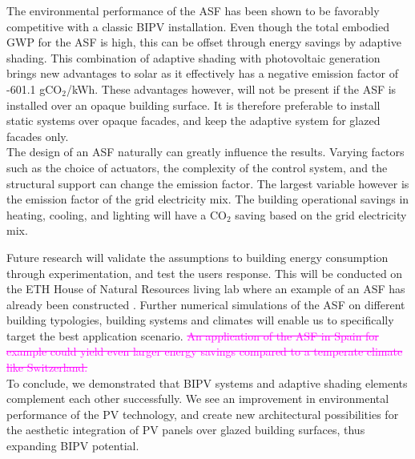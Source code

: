 
The environmental performance of the ASF has been shown to be favorably competitive with a classic BIPV installation. Even though the total embodied GWP for the ASF is high, this can be offset through energy savings by adaptive shading. This combination of adaptive shading with photovoltaic generation brings new advantages to solar as it effectively has a negative emission factor of -601.1 gCO${_2}$/kWh. These advantages however, will not be present if the ASF is installed over an opaque building surface. It is therefore preferable to install static systems over opaque facades, and keep the adaptive system for glazed facades only.\\

The design of an ASF naturally can greatly influence the results. Varying factors such as the choice of actuators, the complexity of the control system, and the structural support can change the emission factor. The largest variable however is the emission factor of the grid electricity mix. The building operational savings in heating, cooling, and lighting will have a CO${_2}$ saving based on the grid electricity mix. 

Future research will validate the assumptions to building energy consumption through experimentation, and test the users response. This will be conducted on the ETH House of Natural Resources living lab where an example of an ASF has already been constructed \cite{nagy2015frontiers}. Further numerical simulations of the ASF on different building typologies, building systems and climates will enable us to specifically target the best application scenario. \textcolor{magenta}{\sout{An application of the ASF in Spain for example could yield even larger energy savings compared to a temperate climate like Switzerland.}}\\

To conclude, we demonstrated that BIPV systems and adaptive shading elements complement each other successfully. We see an improvement in environmental performance of the PV technology, and create new architectural possibilities for the aesthetic integration of PV panels over glazed building surfaces, thus expanding BIPV potential. 






